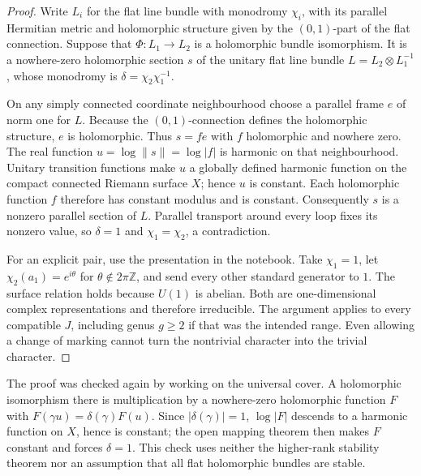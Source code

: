 \begin{proof}
Write \(L_i\) for the flat line bundle with monodromy \(\chi_i\), with its
parallel Hermitian metric and holomorphic structure given by the
\((0,1)\)-part of the flat connection.  Suppose that
\(\Phi:L_1\to L_2\) is a holomorphic bundle isomorphism.  It is a nowhere-zero
holomorphic section \(s\) of the unitary flat line bundle
\(L=L_2\otimes L_1^{-1}\), whose monodromy is
\(\delta=\chi_2\chi_1^{-1}\).

On any simply connected coordinate neighbourhood choose a parallel frame
\(e\) of norm one for \(L\).  Because the \((0,1)\)-connection defines the
holomorphic structure, \(e\) is holomorphic.  Thus \(s=f e\) with \(f\)
holomorphic and nowhere zero.  The real function
\(u=\log\lVert s\rVert=\log|f|\) is harmonic on that neighbourhood.  Unitary
transition functions make \(u\) a globally defined harmonic function on the
compact connected Riemann surface \(X\); hence \(u\) is constant.  Each
holomorphic function \(f\) therefore has constant modulus and is constant.
Consequently \(s\) is a nonzero parallel section of \(L\).  Parallel
transport around every loop fixes its nonzero value, so \(\delta=1\) and
\(\chi_1=\chi_2\), a contradiction.

For an explicit pair, use the presentation in the notebook.  Take
\(\chi_1=1\), let \(\chi_2(a_1)=e^{i\theta}\) for
\(\theta\notin2\pi\mathbb Z\), and send every other standard generator to
\(1\).  The surface relation holds because \(U(1)\) is abelian.  Both are
one-dimensional complex representations and therefore irreducible.  The
argument applies to every compatible \(J\), including genus \(g\geq2\)
if that was the intended range.  Even allowing a change of marking cannot
turn the nontrivial character into the trivial character.
\end{proof}

\begin{remark}
The proof was checked again by working on the universal cover.  A
holomorphic isomorphism there is multiplication by a nowhere-zero
holomorphic function \(F\) with
\(F(\gamma u)=\delta(\gamma)F(u)\).  Since \(|\delta(\gamma)|=1\),
\(\log|F|\) descends to a harmonic function on \(X\), hence is constant;
the open mapping theorem then makes \(F\) constant and forces
\(\delta=1\).  This check uses neither the higher-rank stability theorem
nor an assumption that all flat holomorphic bundles are stable.
\end{remark}
